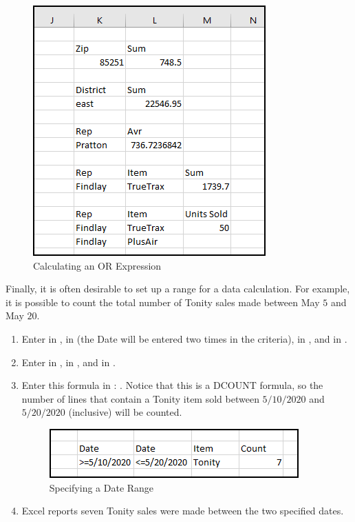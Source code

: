 \begin{enumerate}
	\begin{figure}[H]
		\centering
		\includegraphics[width=\maxwidth{.95\linewidth}]{gfx/ch09_fig23}
		\caption{Calculating an OR Expression}
		\label{09:fig23}
	\end{figure}
\end{enumerate}

Finally, it is often desirable to set up a range for a data calculation. For example, it is possible to count the total number of Tonity sales made between May $ 5 $ and May $ 20 $.

\begin{enumerate}
	\item Enter  in ,  in  (the Date will be entered two times in the criteria),  in , and  in .
	\item Enter  in ,  in , and  in .
	\item Enter this formula in : . Notice that this is a DCOUNT formula, so the number of lines that contain a Tonity item sold between $ 5/10/2020 $ and $ 5/20/2020 $ (inclusive) will be counted.
	
	\begin{figure}[H]
		\centering
		\includegraphics[width=\maxwidth{.95\linewidth}]{gfx/ch09_fig24}
		\caption{Specifying a Date Range}
		\label{09:fig24}
	\end{figure}

	\item Excel reports seven Tonity sales were made between the two specified dates.

\end{enumerate}


